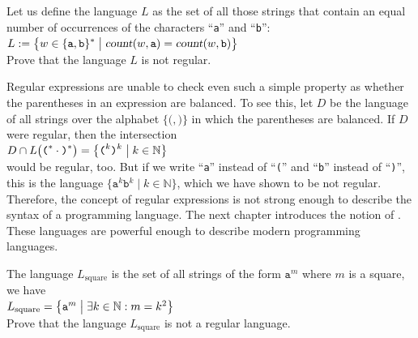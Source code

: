 \exerciseEng
Let us define the language $L$ as the set of all those strings that contain an equal number of 
occurrences of the characters ``\texttt{a}'' and  ``\texttt{b}'':
\\[0.2cm]
\hspace*{1.3cm}
$\displaystyle L := \bigl\{ w \in \{\texttt{a}, \texttt{b}\}^* \bigm| \textsl{count}(w, \texttt{a})=\textsl{count}(w, \texttt{b}) \bigr\}$
\\[0.2cm]
Prove that the language $L$ is not regular. \eox

\remarkEng
Regular expressions are unable to check even such a simple property as whether the parentheses in an
expression are balanced.  To see this, let $D$ be the language of all strings over the alphabet
$\{ \texttt{(}, \texttt{)} \}$ in which the parentheses are balanced.  If $D$ were regular, then the
intersection
\\[0.2cm]
\hspace*{1.3cm}
$D \cap L\bigl(\texttt{(}^* \cdot \texttt{)}^*\bigr) = \bigl\{ \texttt{(}^k \texttt{)}^k \bigm| k \in \mathbb{N} \bigr\}$
\\[0.2cm]
would be regular, too.  But if we write ``\texttt{a}'' instead of ``\texttt{(}'' and ``\texttt{b}'' instead of
``\texttt{)}'', this is the language $\{ \mathtt{a}^k\mathtt{b}^k \mid k \in \mathbb{N} \}$, which we have
shown to be not regular.
Therefore, the concept of regular expressions is not strong enough to describe the syntax of a programming language.
The next chapter introduces the notion of .  These languages
are powerful enough to describe modern programming languages. 

\exerciseEng
The language  $L_{\mathrm{square}}$ is the set of all strings of the form $\mathtt{a}^m$ where $m$
is a square, we have
\\[0.2cm]
\hspace*{1.3cm}
$L_{\mathrm{square}} = \bigl\{ \mathtt{a}^{m} \bigm| \exists k \in \mathbb{N}: m = k^2 \bigr\}$
\\[0.2cm]
Prove that the language  $L_{\mathrm{square}}$ is not a regular language.
\eox
\vspace*{0.1cm}

